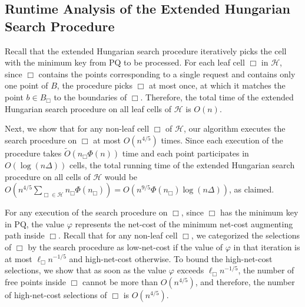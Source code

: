 \documentclass[11pt,onecolumn]{article}
\def\mcH{{\mathcal{H}}}
\newcommand{\cell}{\Box}
\newcommand{\pq}{\mathrm{PQ}}
\newcommand{\ymax}{\varphi}
\begin{document}
%

%



%





%
%


%


%

%
%
%
%
%
%
%
%
%
%
%
%
%
%
%
%

%
%
%
%
%
%
%
%
%
%
%
%
%
%
%
%
%


\subsection{Runtime Analysis of the Extended Hungarian Search Procedure}\label{appendix:hung_time}
Recall that the extended Hungarian search procedure iteratively picks the cell with the minimum key from $\pq$ to be processed.
For each leaf cell $\cell$ in $\mcH$, since $\cell$ contains the points corresponding to a single request and contains only one point of $B$, the procedure picks $\cell$ at most once, at which it matches the point $b\in B_\cell$ to the boundaries of $\cell$. Therefore, the total time of the extended Hungarian search procedure on all leaf cells of $\mcH$ is $O(n)$. 

Next, we show that for any non-leaf cell $\cell$ of $\mcH$, our algorithm executes the search procedure on $\cell$ at most $O(n^{4/5})$ times. Since each execution of the procedure takes $\tilde{O}(n_{\cell}\Phi(n))$ time and each point participates in $O(\log (n\Delta))$ cells, the total running time of the extended Hungarian search procedure on all cells of $\mcH$ would be $O(n^{4/5}\sum_{\cell\in\mcH}n_\cell\Phi(n_\cell)) = O(n^{9/5}\Phi(n_\cell)\log(n\Delta))$, as claimed.

For any execution of the search procedure on $\cell$, since $\cell$ has the minimum key in $\pq$, the value $\ymax$ represents the net-cost of the minimum net-cost augmenting path inside $\cell$.
Recall that for any non-leaf cell $\cell$, we categorized the selections of $\cell$ by the search procedure as low-net-cost if the value of $\ymax$ in that iteration is at most $\ell_\cell n^{-1/5}$ and high-net-cost otherwise. 
To bound the high-net-cost selections, we show that as soon as the value $\ymax$ exceeds $\ell_\cell n^{-1/5}$, the number of free points inside $\cell$ cannot be more than $O(n^{4/5})$, and therefore, the number of high-net-cost selections of $\cell$ is $O(n^{4/5})$.
\end{document}
